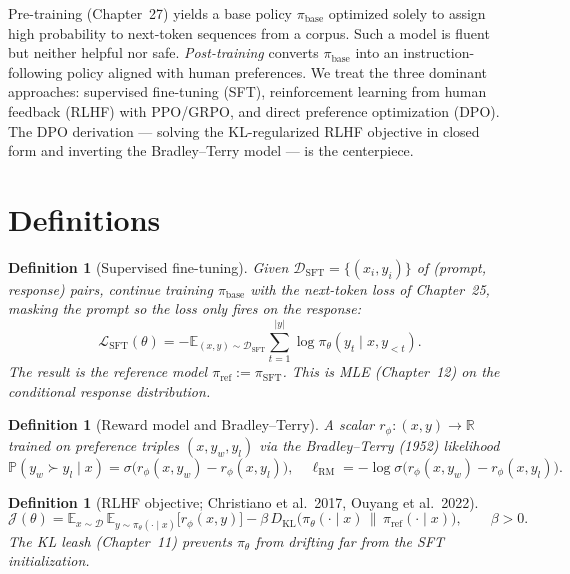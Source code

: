 \documentclass[11pt]{article}
\newtheorem{definition}[theorem]{Definition}
\theoremstyle{remark}
\begin{document}
Pre-training (Chapter~27) yields a base policy $\pi_{\mathrm{base}}$ optimized solely to assign high probability to next-token sequences from a corpus. Such a model is fluent but neither helpful nor safe. \emph{Post-training} converts $\pi_{\mathrm{base}}$ into an instruction-following policy aligned with human preferences. We treat the three dominant approaches: supervised fine-tuning (SFT), reinforcement learning from human feedback (RLHF) with PPO/GRPO, and direct preference optimization (DPO). The DPO derivation --- solving the KL-regularized RLHF objective in closed form and inverting the Bradley--Terry model --- is the centerpiece.

\section*{Definitions}

\begin{definition}[Supervised fine-tuning]
Given $\mathcal{D}_{\mathrm{SFT}}=\{(x_i,y_i)\}$ of (prompt, response) pairs, continue training $\pi_{\mathrm{base}}$ with the next-token loss of Chapter~25, masking the prompt so the loss only fires on the response:
\[
\mathcal{L}_{\mathrm{SFT}}(\theta) = -\mathbb{E}_{(x,y)\sim\mathcal{D}_{\mathrm{SFT}}}\sum_{t=1}^{|y|}\log\pi_\theta(y_t\mid x,y_{<t}).
\]
The result is the \emph{reference model} $\pi_{\mathrm{ref}}:=\pi_{\mathrm{SFT}}$. This is MLE (Chapter~12) on the conditional response distribution.
\end{definition}

\begin{definition}[Reward model and Bradley--Terry]
A scalar $r_\phi:(x,y)\to\mathbb{R}$ trained on preference triples $(x,y_w,y_l)$ via the Bradley--Terry (1952) likelihood
\[
\mathbb{P}(y_w\succ y_l\mid x) = \sigma\!\big(r_\phi(x,y_w)-r_\phi(x,y_l)\big),\quad
\ell_{\mathrm{RM}} = -\log\sigma\!\big(r_\phi(x,y_w)-r_\phi(x,y_l)\big).
\]
\end{definition}

\begin{definition}[RLHF objective; Christiano et al.\ 2017, Ouyang et al.\ 2022]
\[
\mathcal{J}(\theta) = \mathbb{E}_{x\sim\mathcal{D}}\,\mathbb{E}_{y\sim\pi_\theta(\cdot\mid x)}\!\big[r_\phi(x,y)\big] - \beta\,D_{\mathrm{KL}}\!\big(\pi_\theta(\cdot\mid x)\,\|\,\pi_{\mathrm{ref}}(\cdot\mid x)\big),\qquad \beta>0.
\]
The KL leash (Chapter~11) prevents $\pi_\theta$ from drifting far from the SFT initialization.
\end{definition}
\end{document}

